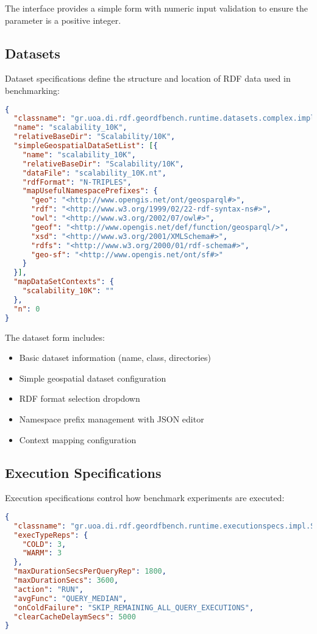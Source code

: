 \documentclass[11pt,a4paper]{article}
\begin{document}
The interface provides a simple form with numeric input validation to ensure the parameter is a positive integer.

\subsection{Datasets}

Dataset specifications define the structure and location of RDF data used in benchmarking:

\begin{lstlisting}[language=JSON, caption=Dataset Specification Example]
{
  "classname": "gr.uoa.di.rdf.geordfbench.runtime.datasets.complex.impl.GeographicaDS",
  "name": "scalability_10K",
  "relativeBaseDir": "Scalability/10K",
  "simpleGeospatialDataSetList": [{
    "name": "scalability_10K",
    "relativeBaseDir": "Scalability/10K",
    "dataFile": "scalability_10K.nt",
    "rdfFormat": "N-TRIPLES",
    "mapUsefulNamespacePrefixes": {
      "geo": "<http://www.opengis.net/ont/geosparql#>",
      "rdf": "<http://www.w3.org/1999/02/22-rdf-syntax-ns#>",
      "owl": "<http://www.w3.org/2002/07/owl#>",
      "geof": "<http://www.opengis.net/def/function/geosparql/>",
      "xsd": "<http://www.w3.org/2001/XMLSchema#>",
      "rdfs": "<http://www.w3.org/2000/01/rdf-schema#>",
      "geo-sf": "<http://www.opengis.net/ont/sf#>"
    }
  }],
  "mapDataSetContexts": {
    "scalability_10K": ""
  },
  "n": 0
}
\end{lstlisting}

The dataset form includes:
\begin{itemize}
    \item Basic dataset information (name, class, directories)
    \item Simple geospatial dataset configuration
    \item RDF format selection dropdown
    \item Namespace prefix management with JSON editor
    \item Context mapping configuration
\end{itemize}

\subsection{Execution Specifications}

Execution specifications control how benchmark experiments are executed:

\begin{lstlisting}[language=JSON, caption=Execution Specification Example]
{
  "classname": "gr.uoa.di.rdf.geordfbench.runtime.executionspecs.impl.SimpleES",
  "execTypeReps": {
    "COLD": 3,
    "WARM": 3
  },
  "maxDurationSecsPerQueryRep": 1800,
  "maxDurationSecs": 3600,
  "action": "RUN",
  "avgFunc": "QUERY_MEDIAN",
  "onColdFailure": "SKIP_REMAINING_ALL_QUERY_EXECUTIONS",
  "clearCacheDelaymSecs": 5000
}
\end{lstlisting}
\end{document}
